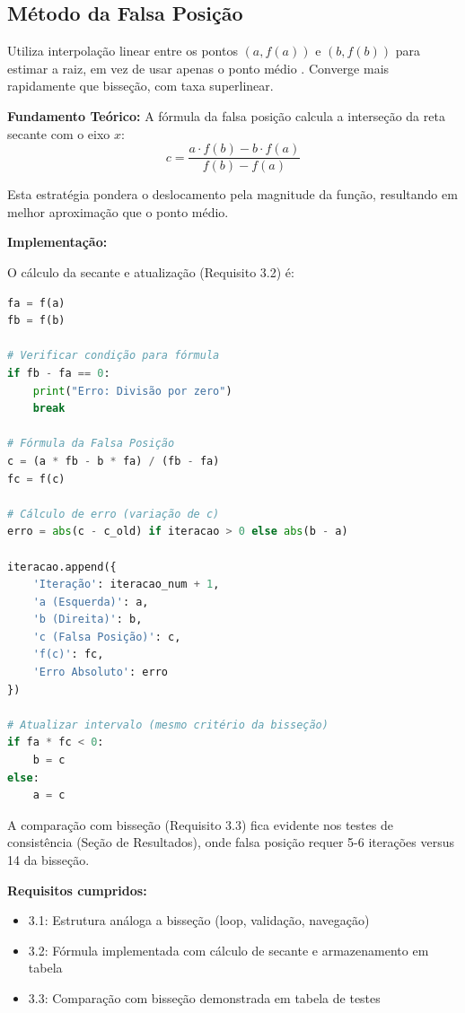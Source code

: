 \documentclass[
	12pt,				%
	openright,			%
	oneside,			%
	a4paper,			%
	english,			%
	brazil				%
	]{abntex2}
\begin{document}
\subsection{Método da Falsa Posição}

Utiliza interpolação linear entre os pontos $(a, f(a))$ e $(b, f(b))$ para estimar a raiz, em vez de usar apenas o ponto médio \cite{chapra2016}. Converge mais rapidamente que bisseção, com taxa superlinear.

\textbf{Fundamento Teórico:}
A fórmula da falsa posição calcula a interseção da reta secante com o eixo $x$:
$$c = \frac{a \cdot f(b) - b \cdot f(a)}{f(b) - f(a)}$$

Esta estratégia pondera o deslocamento pela magnitude da função, resultando em melhor aproximação que o ponto médio.

\vspace{0.3cm}

\textbf{Implementação:}

O cálculo da secante e atualização (Requisito 3.2) é:

\begin{lstlisting}[language=Python, caption={Requisito 3.2 - Cálculo da Falsa Posição}]
fa = f(a)
fb = f(b)

# Verificar condição para fórmula
if fb - fa == 0:
    print("Erro: Divisão por zero")
    break

# Fórmula da Falsa Posição
c = (a * fb - b * fa) / (fb - fa)
fc = f(c)

# Cálculo de erro (variação de c)
erro = abs(c - c_old) if iteracao > 0 else abs(b - a)

iteracao.append({
    'Iteração': iteracao_num + 1,
    'a (Esquerda)': a,
    'b (Direita)': b,
    'c (Falsa Posição)': c,
    'f(c)': fc,
    'Erro Absoluto': erro
})

# Atualizar intervalo (mesmo critério da bisseção)
if fa * fc < 0:
    b = c
else:
    a = c
\end{lstlisting}

A comparação com bisseção (Requisito 3.3) fica evidente nos testes de consistência (Seção de Resultados), onde falsa posição requer 5-6 iterações versus 14 da bisseção.

\vspace{0.3cm}

\textbf{Requisitos cumpridos:}
\begin{itemize}
    \item[✓] 3.1: Estrutura análoga a bisseção (loop, validação, navegação)
    \item[✓] 3.2: Fórmula implementada com cálculo de secante e armazenamento em tabela
    \item[✓] 3.3: Comparação com bisseção demonstrada em tabela de testes
\end{itemize}
\end{document}
